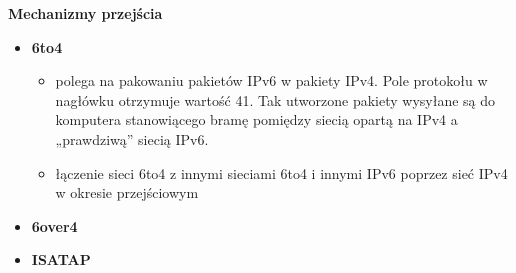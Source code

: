 \documentclass[../main.tex]{subfiles}
\begin{document}
    \textbf{Mechanizmy przejścia}
    \begin{itemize}
        \item \textbf{6to4}
        \begin{itemize}
            \item polega na pakowaniu pakietów IPv6 w pakiety IPv4. Pole protokołu w nagłówku otrzymuje wartość 41. Tak utworzone pakiety wysyłane są do komputera stanowiącego bramę pomiędzy siecią opartą na IPv4 a „prawdziwą” siecią IPv6.
            \item łączenie sieci 6to4 z innymi sieciami 6to4 i innymi IPv6 poprzez sieć IPv4 w okresie przejściowym
        \end{itemize}
        \item \textbf{6over4}
        \item \textbf{ISATAP}
    \end{itemize}
\end{document}
